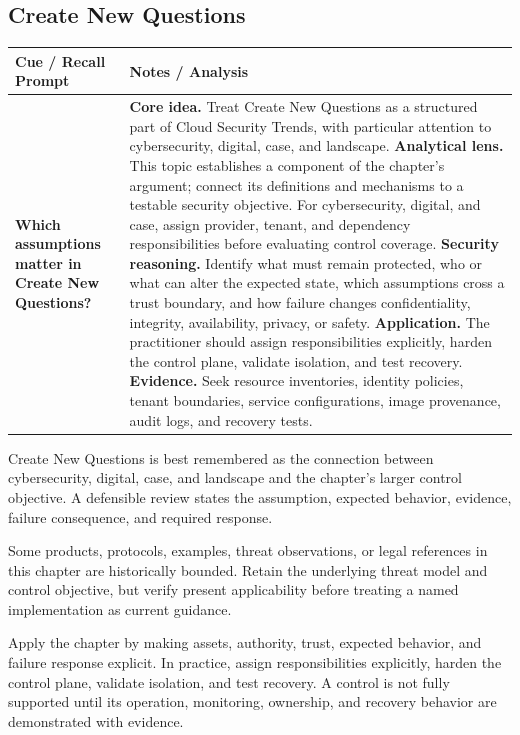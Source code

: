 \documentclass[11pt]{article}
\newcommand{\CornellHeader}{%
\rowcolor{Navy}\color{white}\bfseries Cue / Recall Prompt & \color{white}\bfseries Notes / Analysis\\\hline}
\newcommand{\CornellRow}[2]{%
\cellcolor{CueGray}\RaggedRight\textbf{#1} & \RaggedRight #2\\\hline}
\begin{document}
\subsection*{Create New Questions}
\begin{longtable}{>{\RaggedRight\arraybackslash}p{}|>{\RaggedRight\arraybackslash}p{}}
\CornellHeader
\CornellRow{Which assumptions matter in Create New Questions?}{\textbf{Core idea.} Treat Create New Questions as a structured part of Cloud Security Trends, with particular attention to cybersecurity, digital, case, and landscape. \textbf{Analytical lens.} This topic establishes a component of the chapter's argument; connect its definitions and mechanisms to a testable security objective. For cybersecurity, digital, and case, assign provider, tenant, and dependency responsibilities before evaluating control coverage. \textbf{Security reasoning.} Identify what must remain protected, who or what can alter the expected state, which assumptions cross a trust boundary, and how failure changes confidentiality, integrity, availability, privacy, or safety. \textbf{Application.} The practitioner should assign responsibilities explicitly, harden the control plane, validate isolation, and test recovery. \textbf{Evidence.} Seek resource inventories, identity policies, tenant boundaries, service configurations, image provenance, audit logs, and recovery tests.}
\end{longtable}
\begin{topicsummary}
Create New Questions is best remembered as the connection between cybersecurity, digital, case, and landscape and the chapter's larger control objective. A defensible review states the assumption, expected behavior, evidence, failure consequence, and required response.
\end{topicsummary}
\begin{historybox}
Some products, protocols, examples, threat observations, or legal references in this chapter are historically bounded. Retain the underlying threat model and control objective, but verify present applicability before treating a named implementation as current guidance.
\end{historybox}
\begin{defensebox}
Apply the chapter by making assets, authority, trust, expected behavior, and failure response explicit. In practice, assign responsibilities explicitly, harden the control plane, validate isolation, and test recovery. A control is not fully supported until its operation, monitoring, ownership, and recovery behavior are demonstrated with evidence.
\end{defensebox}
\end{document}
